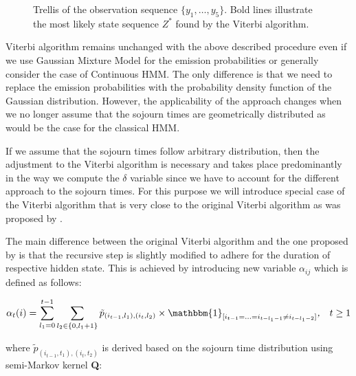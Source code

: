 \begin{figure}[htbp]
\begin{center}
\end{center}
\label{fig:viterbi}
\caption[Viterbi path through trellis]{Trellis of the observation sequence $\{y_1, \ldots,y_5\}$. Bold lines illustrate the most likely state sequence $Z^*$ found by the Viterbi algorithm.}
\end{figure}

Viterbi algorithm remains unchanged with the above described procedure even if we use Gaussian Mixture Model for the emission probabilities or generally 
consider the case of Continuous HMM. The only difference is that we need to replace the emission probabilities with the probability density function of the Gaussian distribution.
However, the applicability of the approach changes when we no longer assume that the sojourn times are geometrically distributed as would be the case for the classical HMM. 

If we assume that the sojourn times follow arbitrary distribution, then the adjustment to the Viterbi algorithm is necessary and 
takes place predominantly in the way we compute the $\delta$ variable since we have to account for the different 
approach to the sojourn times. For this purpose we will introduce special case of the Viterbi algorithm that 
is very close to the original Viterbi algorithm as was proposed by \citep{Pertsinidou2015}.

The main difference between the original Viterbi algorithm and the one proposed by \citep{Pertsinidou2015} is that the 
recursive step is slightly modified to adhere for the duration of respective hidden state. This is achieved by 
introducing new variable $\alpha_{ij}$ which is defined as follows:

\begin{equation}
    \alpha_{t}(i) = \sum\limits_{l_1=0}^{t-1} \sum\limits_{l_2 \in \{0,l_1+1\}} \tilde{p}_{(i_{t-1},l_1),(i_{t},l_2)} \times \mathbbm{1}_{[i_{t-1}=\ldots=i_{t-l_1-1} \neq i_{t-l_1-2}]} \textit{,} \quad t \geq 1
\end{equation}

where $\tilde{p}_{(i_{t-1},t_1),(i_{t},t_2)}$ is derived based on the sojourn time distribution using semi-Markov kernel \textbf{Q}:

